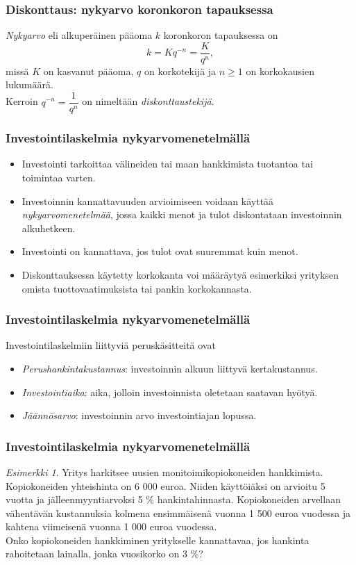 \documentclass{beamer}\usepackage[]{graphicx}\usepackage[]{color}
\theoremstyle{remark}
\newtheorem{esim}{Esimerkki}
\newcommand{\pblock}{\\ \vspace{0.5cm}\pause}
\begin{document}
\begin{frame}
    \frametitle{Diskonttaus: nykyarvo koronkoron tapauksessa}
    \pause
    \begin{block}{}
        \emph{Nykyarvo} eli alkuperäinen pääoma $k$ koronkoron tapauksessa on
        \[
            k = Kq^{-n} = \frac{K}{q^n},
        \]
        missä $K$ on kasvanut pääoma, $q$ on korkotekijä ja $n \geq 1$ on korkokausien lukumäärä.
        \pblock
        Kerroin $q^{-n} = \dfrac{1}{q^n}$ on nimeltään \emph{diskonttaustekijä}.
    \end{block}
\end{frame}

\begin{frame}
    \frametitle{Investointilaskelmia nykyarvomenetelmällä}
    \begin{itemize}
        \item {Investointi} tarkoittaa välineiden tai maan hankkimista tuotantoa tai toimintaa varten. \pause
        \item Investoinnin kannattavuuden arvioimiseen voidaan käyttää \emph{nykyarvomenetelmää}, jossa kaikki menot ja tulot diskontataan investoinnin alkuhetkeen.  \pause
        \item Investointi on kannattava, jos tulot ovat suuremmat kuin menot. \pause
        \item Diskonttauksessa käytetty korkokanta voi määräytyä esimerkiksi yrityksen omista tuottovaatimuksista tai pankin korkokannasta.
    \end{itemize}
\end{frame}

\begin{frame}
    \frametitle{Investointilaskelmia nykyarvomenetelmällä}
    Investointilaskelmiin liittyviä peruskäsitteitä ovat \pause
    \begin{itemize}
        \item \emph{Perushankintakustannus}: investoinnin alkuun liittyvä kertakustannus. \pause
        \item \emph{Investointiaika}: aika, jolloin investoinnista oletetaan saatavan hyötyä. \pause
        \item \emph{Jäännösarvo}: investoinnin arvo investointiajan lopussa.
    \end{itemize}
\end{frame}

\begin{frame}
\frametitle{Investointilaskelmia nykyarvomenetelmällä}
    \begin{esim}
    Yritys harkitsee uusien monitoimikopiokoneiden hankkimista.
    Kopiokoneiden yhteishinta on 6 000 euroa. Niiden käyttöiäksi on arvioitu 5 vuotta ja jälleenmyyntiarvoksi 5 \% hankintahinnasta.
    Kopiokoneiden arvellaan vähentävän kustannuksia kolmena ensimmäisenä vuonna 1 500 euroa vuodessa ja kahtena viimeisenä vuonna 1 000 euroa vuodessa.
    \pblock
    Onko kopiokoneiden hankkiminen yritykselle kannattavaa, jos hankinta rahoitetaan lainalla, jonka vuosikorko on 3 \%?
    \end{esim}
\end{frame}
\end{document}
